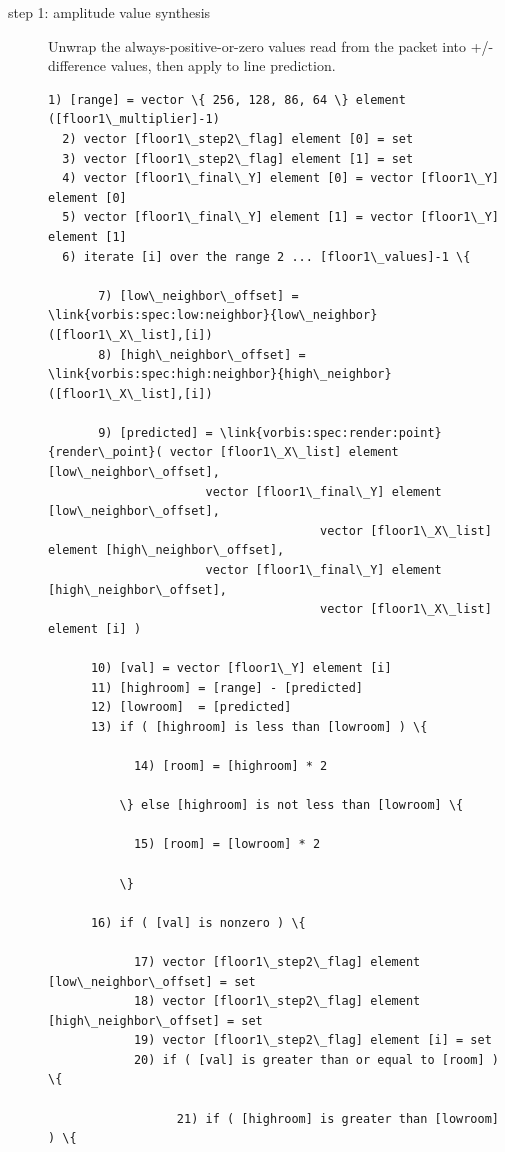 \begin{description}
\item[step 1: amplitude value synthesis]

Unwrap the always-positive-or-zero values read from the packet into
+/- difference values, then apply to line prediction.

\begin{Verbatim}[commandchars=\\\{\}]
  1) [range] = vector \{ 256, 128, 86, 64 \} element ([floor1\_multiplier]-1)
  2) vector [floor1\_step2\_flag] element [0] = set
  3) vector [floor1\_step2\_flag] element [1] = set
  4) vector [floor1\_final\_Y] element [0] = vector [floor1\_Y] element [0]
  5) vector [floor1\_final\_Y] element [1] = vector [floor1\_Y] element [1]
  6) iterate [i] over the range 2 ... [floor1\_values]-1 \{

       7) [low\_neighbor\_offset] = \link{vorbis:spec:low:neighbor}{low\_neighbor}([floor1\_X\_list],[i])
       8) [high\_neighbor\_offset] = \link{vorbis:spec:high:neighbor}{high\_neighbor}([floor1\_X\_list],[i])

       9) [predicted] = \link{vorbis:spec:render:point}{render\_point}( vector [floor1\_X\_list] element [low\_neighbor\_offset],
				      vector [floor1\_final\_Y] element [low\_neighbor\_offset],
                                      vector [floor1\_X\_list] element [high\_neighbor\_offset],
				      vector [floor1\_final\_Y] element [high\_neighbor\_offset],
                                      vector [floor1\_X\_list] element [i] )

      10) [val] = vector [floor1\_Y] element [i]
      11) [highroom] = [range] - [predicted]
      12) [lowroom]  = [predicted]
      13) if ( [highroom] is less than [lowroom] ) \{

            14) [room] = [highroom] * 2

          \} else [highroom] is not less than [lowroom] \{

            15) [room] = [lowroom] * 2

          \}

      16) if ( [val] is nonzero ) \{

            17) vector [floor1\_step2\_flag] element [low\_neighbor\_offset] = set
            18) vector [floor1\_step2\_flag] element [high\_neighbor\_offset] = set
            19) vector [floor1\_step2\_flag] element [i] = set
            20) if ( [val] is greater than or equal to [room] ) \{

                  21) if ( [highroom] is greater than [lowroom] ) \{


\end{Verbatim}
\end{description}
